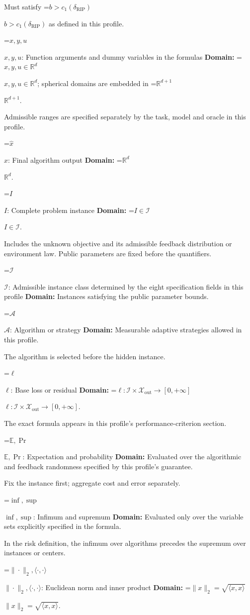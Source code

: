 \documentclass[10pt,a4paper]{article}
\newcommand{\AtlasMath}[1]{\par\begingroup\centering\setbox0=\hbox{$\displaystyle #1$}\ifdim\wd0>1.4\linewidth\typeout{ATLAS WIDE FORMULA: \the\wd0}\fi\ifdim\wd0>\linewidth\resizebox{\linewidth}{!}{\box0}\else\box0\fi\par\endgroup}
\newcommand{\AtlasInlineMath}[1]{\begingroup\setbox0=\hbox{$#1$}\ifdim\wd0>.4\linewidth\endgroup\AtlasMath{#1}\else\endgroup$#1$\fi}
\begin{document}
Must satisfy \AtlasInlineMath{b>c_1(\delta_{\mathrm{RIP}})} as defined in this profile.

\AtlasInlineMath{x,y,u}: Function arguments and dummy variables in the formulas \textbf{Domain:} \AtlasInlineMath{x,y,u\in\mathbb{R}^d}; spherical domains are embedded in \AtlasInlineMath{\mathbb{R}^{d+1}}.

Admissible ranges are specified separately by the task, model and oracle in this profile.

\AtlasInlineMath{\widehat{x}}: Final algorithm output \textbf{Domain:} \AtlasInlineMath{\mathbb{R}^d}.

\AtlasInlineMath{I}: Complete problem instance \textbf{Domain:} \AtlasInlineMath{I\in\mathcal{I}}.

Includes the unknown objective and its admissible feedback distribution or environment law. Public parameters are fixed before the quantifiers.

\AtlasInlineMath{\mathcal{I}}: Admissible instance class determined by the eight specification fields in this profile \textbf{Domain:} Instances satisfying the public parameter bounds.

\AtlasInlineMath{\mathcal{A}}: Algorithm or strategy \textbf{Domain:} Measurable adaptive strategies allowed in this profile.

The algorithm is selected before the hidden instance.

\AtlasInlineMath{\ell}: Base loss or residual \textbf{Domain:} \AtlasInlineMath{\ell:\mathcal{I}\times\mathcal{X}_{\mathrm{out}}\to[0,+\infty]}.

The exact formula appears in this profile's performance-criterion section.

\AtlasInlineMath{\mathbb{E},\Pr}: Expectation and probability \textbf{Domain:} Evaluated over the algorithmic and feedback randomness specified by this profile's guarantee.

Fix the instance first; aggregate cost and error separately.

\AtlasInlineMath{\inf,\sup}: Infimum and supremum \textbf{Domain:} Evaluated only over the variable sets explicitly specified in the formula.

In the risk definition, the infimum over algorithms precedes the supremum over instances or centers.

\AtlasInlineMath{\|\cdot\|_2,\langle\cdot,\cdot\rangle}: Euclidean norm and inner product \textbf{Domain:} \AtlasInlineMath{\|x\|_2=\sqrt{\langle x,x\rangle}}.
\end{document}
